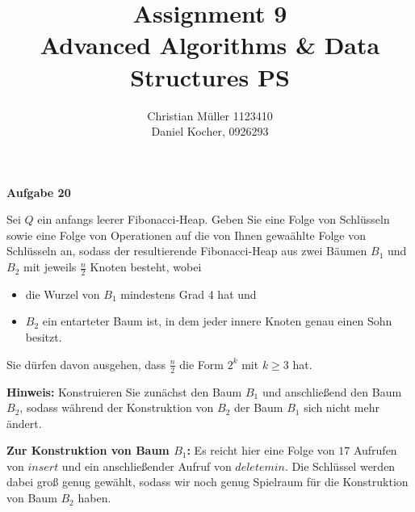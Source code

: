 \documentclass{article}
\begin{document}
\title{Assignment 9 \\ Advanced Algorithms \& Data Structures PS}%
\author{Christian Müller 1123410 \\ Daniel Kocher, 0926293}%
\maketitle

{\bfseries Aufgabe 20}%

Sei $Q$ ein anfangs leerer Fibonacci-Heap. Geben Sie eine Folge von Schl{\"u}sseln
sowie eine Folge von Operationen auf die von Ihnen gewa{\"a}hlte Folge von
Schl{\"u}sseln an, sodass der resultierende Fibonacci-Heap aus zwei B{\"a}umen
$B_1$ und $B_2$ mit jeweils $\frac{n}{2}$ Knoten besteht, wobei
{\parskip0pt
  \begin{itemize}
    \item die Wurzel von $B_1$ mindestens Grad $4$ hat und
    \item $B_2$ ein entarteter Baum ist, in dem jeder innere Knoten genau einen
      Sohn besitzt.
  \end{itemize}
}
Sie d{\"u}rfen davon ausgehen, dass $\frac{n}{2}$ die Form $2^k$ mit $k \geq 3$
hat.

\textbf{Hinweis:} Konstruieren Sie zun{\"a}chst den Baum $B_1$ und
anschlie{\ss}end den Baum $B_2$, sodass w{\"a}hrend der Konstruktion von $B_2$
der Baum $B_1$ sich nicht mehr {\"a}ndert.

\textbf{Zur Konstruktion von Baum $B_1$:} \newline
Es reicht hier eine Folge von $17$ Aufrufen von $insert$ und ein
anschlie{\ss}ender Aufruf von $deletemin$. Die Schl{\"u}ssel werden dabei gro{\ss}
genug gew{\"a}hlt, sodass wir noch genug Spielraum f{\"u}r die Konstruktion von
Baum $B_2$ haben.
\end{document}
